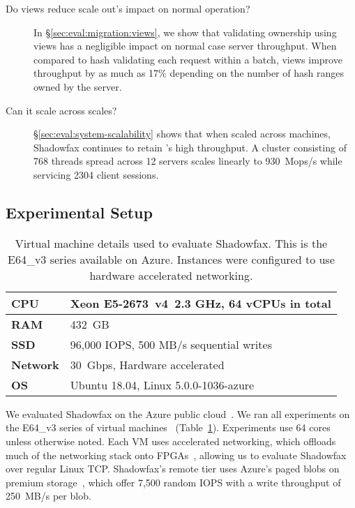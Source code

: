 \begin{description}
\item[Do views reduce scale out's impact on normal operation?]
  In \S\ref{sec:eval:migration:views}, we show that validating ownership
  using views has a negligible impact on normal case server throughput.
%
  When compared to hash validating each request within a batch, views
  improve throughput by as much as 17\% depending on the number of hash
  ranges owned by the server.

\item[Can it scale across scales?]
  \S\ref{sec:eval:system-scalability} shows that when scaled across
  machines, Shadowfax continues to retain \faster's high throughput.
%
  A cluster consisting of 768 threads spread across 12 servers scales
  linearly to 930~Mops/s while servicing 2304 client sessions.

\end{description}

%

\subsection{Experimental Setup}

\begin{table}[t]
\caption{Virtual machine details used to evaluate Shadowfax. This is the
  E64\_v3 series available on Azure. Instances were configured to use
  hardware accelerated networking.}
\centering
\begin{tabular}{p{} p{}}
\toprule
\textbf{CPU} & Xeon E5-2673~v4~2.3 GHz, 64 vCPUs in total
\\
\midrule
\textbf{RAM} & 432~GB
\\
\midrule
\textbf{SSD} & 96,000 IOPS, 500 MB/s sequential writes
\\
\midrule
\textbf{Network} & 30~Gbps, Hardware accelerated
\\
\midrule
\textbf{OS} & Ubuntu 18.04, Linux 5.0.0-1036-azure
\\
\bottomrule
\end{tabular}
\label{table:exptconfig}
\end{table}

We evaluated Shadowfax on the Azure public cloud~\cite{azure}.
%
We ran all experiments on the E64\_v3 series of virtual
machines~\cite{e64} (Table~\ref{table:exptconfig}).
%
Experiments use 64 cores unless otherwise noted.
%
Each VM uses accelerated networking, which offloads
much of the networking stack onto FPGAs~\cite{accel-nw}, allowing us to
evaluate Shadowfax over regular Linux TCP.
%
Shadowfax's remote tier uses Azure's paged blobs on premium
storage~\cite{page-blobs}, which offer 7,500 random IOPS with a write
throughput of 250~MB/s per blob.

